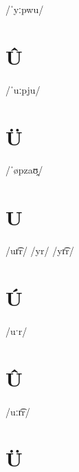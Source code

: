 \documentclass[10pt,a4paper,twoside]{book}
\begin{document}
\begin{multicols}{3}
 {/ˈyːpwu/} {}
\end{multicols}

\section*{Û}

\begin{multicols}{3}
 {/ˈuːpju/} {}
\end{multicols}

\section*{Ü}

\begin{multicols}{3}
 {/ˈøpzaʊ̯/} {}
\end{multicols}

\section*{U}

\begin{multicols}{3}
 {/ur͡r/} {}
 {/yr/} {}
 {/yr͡r/} {}
\end{multicols}

\section*{Ú}

\begin{multicols}{3}
 {/uˑr/} {}
\end{multicols}

\section*{Û}

\begin{multicols}{3}
 {/uːr͡r/} {}
\end{multicols}

\section*{Ü}
\end{document}
